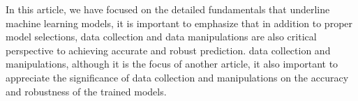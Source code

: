 
\par
In this article, we have focused on the detailed fundamentals that underline machine learning models, it is important to emphasize that in addition to proper model selections, data collection and data manipulations are also critical perspective to achieving accurate and robust prediction.  data collection and manipulations, although it is the focus of another article, it also important to appreciate the significance of data collection and manipulations on the accuracy and robustness of the trained models.
\par 
